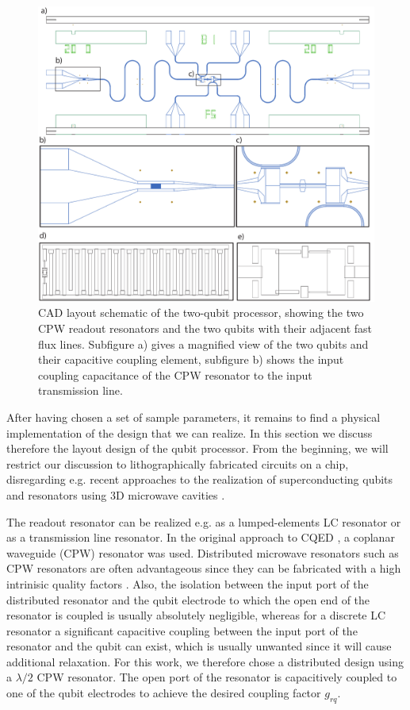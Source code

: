 \begin{figure}[ht!]
	\centering
	\includegraphics[width=\textwidth]{./material/figures/2-qubit-processor/fabrication/qubit_processor_layout}
	\caption[]{CAD layout schematic of the two-qubit processor, showing the two CPW readout resonators and the two qubits with their adjacent fast flux lines. Subfigure a) gives a magnified view of the two qubits and their capacitive coupling element, subfigure b) shows the input coupling capacitance of the CPW resonator to the input transmission line.}
	\label{fig:processor_fabrication}
\end{figure}

After having chosen a set of sample parameters, it remains to find a physical implementation of the design that we can realize. In this section we discuss therefore the layout design of the qubit processor. From the beginning, we will restrict our discussion to lithographically fabricated circuits on a chip, disregarding e.g. recent approaches to the realization of superconducting qubits and resonators using 3D microwave cavities \citep{paik_observation_2011}.

\smallskip

The readout resonator can be realized e.g. as a lumped-elements LC resonator or as a transmission line resonator. In the original approach to CQED \citep{wallraff_strong_2004}, a coplanar waveguide (CPW) resonator was used. Distributed microwave resonators such as CPW resonators are often advantageous since they can be fabricated with a high intrinisic quality factors \citep{}. Also, the isolation between the input port of the distributed resonator and the qubit electrode to which the open end of the resonator is coupled is usually absolutely negligible, whereas for a discrete LC resonator a significant capacitive coupling between the input port of the resonator and the qubit can exist, which is usually unwanted since it will cause additional relaxation. For this work, we therefore chose a distributed design using a $\lambda/2$ CPW resonator. The open port of the resonator is capacitively coupled to one of the qubit electrodes to achieve the desired coupling factor $g_{rq}$.

